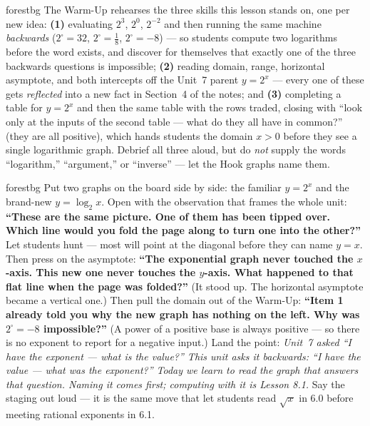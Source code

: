 \documentclass[10pt]{article}
\begin{document}
\begin{fixedskillbox}{forestbg}
    The Warm-Up rehearses the three skills this lesson stands on, one per new idea: \textbf{(1)}
    evaluating $2^3$, $2^0$, $2^{-2}$ and then running the same machine \emph{backwards}
    ($2^{\square}=32$, $2^{\square}=\frac18$, $2^{\square}=-8$) --- so students compute two logarithms
    before the word exists, and discover for themselves that exactly one of the three backwards
    questions is impossible; \textbf{(2)} reading domain, range, horizontal asymptote, and both
    intercepts off the Unit~7 parent $y=2^x$ --- every one of these gets \emph{reflected} into a new
    fact in Section~4 of the notes; and \textbf{(3)} completing a table for $y=2^x$ and then the same
    table with the rows traded, closing with ``look only at the inputs of the second table --- what do
    they all have in common?'' (they are all positive), which hands students the domain $x>0$ before
    they see a single logarithmic graph. Debrief all three aloud, but do \emph{not} supply the words
    ``logarithm,'' ``argument,'' or ``inverse'' --- let the Hook graphs name them.
\end{fixedskillbox}

\begin{skillbox}[Hook]{forestbg}
    Put two graphs on the board side by side: the familiar $y=2^x$ and the brand-new $y=\log_2 x$.
    Open with the observation that frames the whole unit: \textbf{``These are the same picture. One of
    them has been tipped over. Which line would you fold the page along to turn one into the
    other?''} Let students hunt --- most will point at the diagonal before they can name $y=x$. Then
    press on the asymptote: \textbf{``The exponential graph never touched the $x$-axis. This new one
    never touches the $y$-axis. What happened to that flat line when the page was folded?''} (It stood
    up. The horizontal asymptote became a vertical one.) Then pull the domain out of the Warm-Up:
    \textbf{``Item 1 already told you why the new graph has nothing on the left. Why was
    $2^{\square}=-8$ impossible?''} (A power of a positive base is always positive --- so there is no
    exponent to report for a negative input.) Land the point: \emph{Unit~7 asked ``I have the exponent
    --- what is the value?'' This unit asks it backwards: ``I have the value --- what was the
    exponent?'' Today we learn to read the graph that answers that question. Naming it comes first;
    computing with it is Lesson 8.1.} Say the staging out loud --- it is the same move that let
    students read $\sqrt{x}$ in 6.0 before meeting rational exponents in 6.1.
\end{skillbox}
\end{document}

